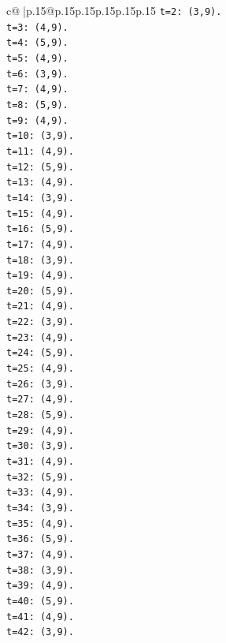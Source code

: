\documentclass{article}
\begin{document}
{\begin{supertabular}{c@{$\;$}|p{.15\linewidth}@{}p{.15\linewidth}p{.15\linewidth}p{.15\linewidth}p{.15\linewidth}p{.15\linewidth}}
{{{\texttt{t=2: (3,9).} \\
\texttt{t=3: (4,9).} \\
\texttt{t=4: (5,9).} \\
\texttt{t=5: (4,9).} \\
\texttt{t=6: (3,9).} \\
\texttt{t=7: (4,9).} \\
\texttt{t=8: (5,9).} \\
\texttt{t=9: (4,9).} \\
\texttt{t=10: (3,9).} \\
\texttt{t=11: (4,9).} \\
\texttt{t=12: (5,9).} \\
\texttt{t=13: (4,9).} \\
\texttt{t=14: (3,9).} \\
\texttt{t=15: (4,9).} \\
\texttt{t=16: (5,9).} \\
\texttt{t=17: (4,9).} \\
\texttt{t=18: (3,9).} \\
\texttt{t=19: (4,9).} \\
\texttt{t=20: (5,9).} \\
\texttt{t=21: (4,9).} \\
\texttt{t=22: (3,9).} \\
\texttt{t=23: (4,9).} \\
\texttt{t=24: (5,9).} \\
\texttt{t=25: (4,9).} \\
\texttt{t=26: (3,9).} \\
\texttt{t=27: (4,9).} \\
\texttt{t=28: (5,9).} \\
\texttt{t=29: (4,9).} \\
\texttt{t=30: (3,9).} \\
\texttt{t=31: (4,9).} \\
\texttt{t=32: (5,9).} \\
\texttt{t=33: (4,9).} \\
\texttt{t=34: (3,9).} \\
\texttt{t=35: (4,9).} \\
\texttt{t=36: (5,9).} \\
\texttt{t=37: (4,9).} \\
\texttt{t=38: (3,9).} \\
\texttt{t=39: (4,9).} \\
\texttt{t=40: (5,9).} \\
\texttt{t=41: (4,9).} \\
\texttt{t=42: (3,9).} \\
}}}
\end{supertabular}}
\end{document}
